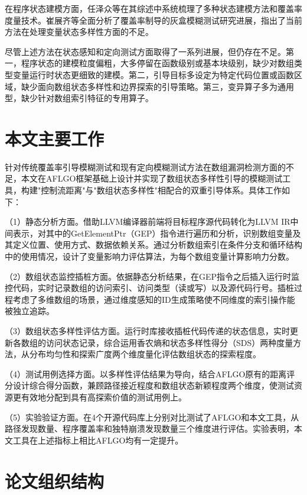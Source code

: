 \documentclass[bachelor]{njupthesis}
\begin{document}
在程序状态建模方面，任泽众等\cite{fuzzing_survey}在其综述中系统梳理了多种状态建模方法和覆盖率度量技术。崔展齐等\cite{coverage_fuzzing_survey}全面分析了覆盖率制导的灰盒模糊测试研究进展，指出了当前方法在处理变量状态多样性方面的不足。

尽管上述方法在状态感知和定向测试方面取得了一系列进展，但仍存在不足。第一，程序状态的建模粒度偏粗，大多停留在函数级别或基本块级别，缺少对数组类型变量运行时状态更细致的建模。第二，引导目标多设定为特定代码位置或函数区域，缺少面向数组状态多样性和边界探索的引导策略。第三，变异算子多为通用型，缺少针对数组索引特征的专用算子。

\section{本文主要工作}

针对传统覆盖率引导模糊测试和现有定向模糊测试方法在数组漏洞检测方面的不足，本文在AFLGO框架基础上设计并实现了数组状态多样性引导的模糊测试工具，构建"控制流距离"与"数组状态多样性"相配合的双重引导体系。具体工作如下：

（1）静态分析方面。借助LLVM编译器前端将目标程序源代码转化为LLVM IR中间表示，对其中的GetElementPtr（GEP）指令进行遍历和分析，识别数组变量及其定义位置、使用方式、数据依赖关系。通过分析数组索引在条件分支和循环结构中的使用情况，设计了变量影响力评估算法，为每个数组变量计算影响力分数。

（2）数组状态监控插桩方面。依据静态分析结果，在GEP指令之后插入运行时监控代码，实时记录数组的访问索引、访问类型（读或写）以及源代码行号。插桩过程考虑了多维数组的场景，通过维度感知的ID生成策略使不同维度的索引操作能被独立追踪。

（3）数组状态多样性评估方面。运行时库接收插桩代码传递的状态信息，实时更新各数组的访问状态记录，综合运用香农熵和状态多样性得分（SDS）两种度量方法，从分布均匀性和探索广度两个维度量化评估数组状态的探索程度。

（4）测试用例选择方面。以多样性评估结果为导向，结合AFLGO原有的距离评分设计综合得分函数，兼顾路径接近程度和数组状态新颖程度两个维度，使测试资源更有效地分配到具有高探索价值的测试用例上。

（5）实验验证方面。在4个开源代码库上分别对比测试了AFLGO和本文工具，从路径发现数量、程序覆盖率和独特崩溃发现数量三个维度进行评估。实验表明，本文工具在上述指标上相比AFLGO均有一定提升。

\section{论文组织结构}
\end{document}
